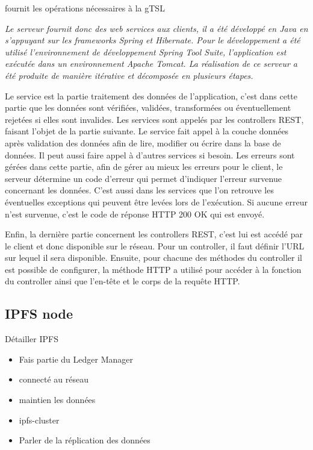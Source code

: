\documentclass{tnreport}
\begin{document}
fournit les opérations nécessaires à la gTSL
{\em
Le serveur fournit donc des web services aux clients, il a été développé en Java en
s'appuyant sur les frameworks Spring et Hibernate. Pour le développement a été utilisé
l'environnement de développement Spring Tool Suite, l'application est exécutée dans un
environnement Apache Tomcat. La réalisation de ce serveur a été produite de manière itérative et
décomposée en plusieurs étapes.

Le service est la partie traitement des données de l'application, c'est dans
cette partie que les données sont vérifiées, validées, transformées ou éventuellement rejetées si elles
sont invalides. Les services sont appelés par les controllers REST, faisant l'objet de la partie
suivante. Le service fait appel à la couche données après validation des données afin de lire, modifier ou
écrire dans la base de données. Il peut aussi faire appel à d'autres services si besoin. Les erreurs sont
gérées dans cette partie, afin de gérer au mieux les erreurs pour le client, le serveur détermine un
code d'erreur qui permet d'indiquer l'erreur survenue concernant les données. C'est aussi dans les
services que l'on retrouve les éventuelles exceptions qui peuvent être levées lors de l'exécution.
Si aucune erreur n'est survenue, c'est le code de
réponse HTTP 200 OK qui est envoyé.

Enfin, la dernière partie concernent les controllers REST, c'est lui est accédé par le client et donc disponible sur le réseau. Pour un controller, il faut définir
l'URL sur lequel il sera disponible. Ensuite, pour chacune des méthodes du controller il est possible
de configurer, la méthode HTTP a utilisé pour accéder à la fonction du controller ainsi que l'en-tête et le corps de la requête HTTP.
}

\subsection{IPFS node}

Détailler IPFS

\begin{itemize}
	\item Fais partie du Ledger Manager
	\item connecté au réseau
	\item maintien les données
	\item ipfs-cluster
	\item Parler de la réplication des données
\end{itemize}
\end{document}

